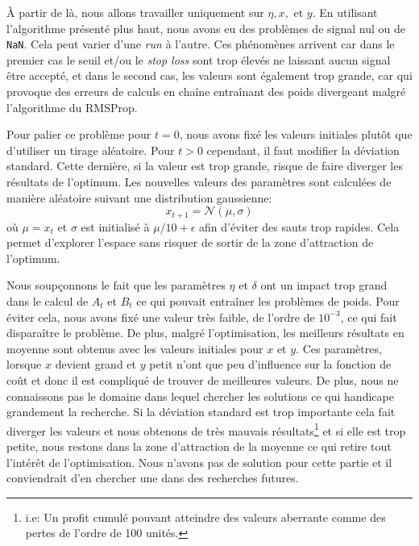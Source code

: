 \documentclass[a4paper, 11pt]{article}
\begin{document}
  À partir de là, nous allons travailler uniquement sur $\eta,x,$ et $y$. En utilisant l'algorithme présenté plus haut, nous avons eu des problèmes
  de signal nul ou de \texttt{NaN}. Cela peut varier d'une \textit{run} à l'autre. Ces phénomènes arrivent car dans le premier cas le seuil et/ou le \textit{stop
  loss} sont trop élevés ne laissant aucun signal être accepté, et dans le second cas, les valeurs sont également trop grande, car qui provoque des erreurs
  de calculs en chaîne entraînant des poids divergeant malgré l'algorithme du RMSProp.
  
  Pour palier ce problème pour $t=0$, nous avons fixé les valeurs initiales plutôt que d'utiliser un tirage aléatoire. Pour $t>0$ cependant, il
  faut modifier la déviation standard. Cette dernière, si la valeur est trop grande, risque de faire diverger les résultats de l'optimum.
  Les nouvelles valeurs des paramètres sont calculées de manière aléatoire suivant une distribution gaussienne:
  $$x_{t+1} = \mathcal{N}(\mu, \sigma)$$
  où $\mu = x_t$ et $\sigma$ est initialisé à $\mu/10 + \epsilon$ afin d'éviter des sauts trop rapides. Cela permet d'explorer l'espace sans risquer de
  sortir de la zone d'attraction de l'optimum.
 
 Nous soupçonnons le fait que les paramètres $\eta$ et $\delta$ ont un impact trop grand dans le calcul de $A_t$ et $B_t$ ce qui pouvait entraîner les
 problèmes de poids. Pour éviter cela, nous avons fixé une valeur très faible, de l'ordre de $10^{-3}$, ce qui fait disparaître le problème.
 De plus, malgré l'optimisation, les meilleurs résultats en moyenne sont obtenus avec les valeurs initiales pour $x$ et $y$. Ces paramètres, lorsque 
 $x$ devient grand et $y$ petit n'ont que peu d'influence sur la fonction de coût et donc il est compliqué de trouver de meilleures valeurs.
 De plus, nous ne connaissons pas le domaine dans lequel chercher les solutions ce qui handicape grandement la recherche. Si la déviation standard est trop importante cela fait diverger les valeurs et nous obtenons de très mauvais résultats\footnote{i.e: Un profit cumulé pouvant atteindre des valeurs aberrante comme des pertes de l'ordre de 100 unités.} et si elle est trop petite, nous restons dans
 la zone d'attraction de la moyenne ce qui retire tout l'intérêt de l'optimisation.
 Nous n'avons pas de solution pour cette partie et il conviendrait d'en chercher une dans des recherches futures.
 
\end{document}
